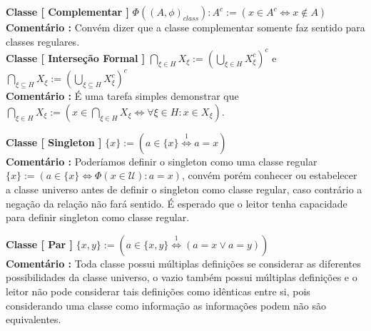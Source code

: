 \documentclass[10pt,a4paper]{report}
\begin{document}
\hspace{\baselineskip}

\textbf{Classe [ Complementar ]} $\Phi( (A,\phi)_{class} ) : A^c := ( x \in A^c \iff x \notin A ) $ \\

\textbf{Comentário :} Convém dizer que a classe complementar somente faz sentido para classes regulares.\\

\textbf{Classe [ Interseção Formal ]} $ \bigcap\limits_{\xi \in H} X_{\xi} := ( \bigcup\limits_{ \xi \in H } X_{\xi}^c  )^c  $ e $ \bigcap\limits_{\xi \subseteq H} X_{\xi} := ( \bigcup\limits_{ \xi \subseteq H } X_{\xi}^c  )^c $\\

\textbf{Comentário :} É uma tarefa simples demonstrar que $ \bigcap\limits_{\xi \in H} X_{\xi} := ( x \in \bigcap\limits_{\xi \in H} X_{\xi} \iff \forall \xi \in H : x \in X_{\xi} ) $.

\hspace{\baselineskip}

\textbf{Classe [ Singleton ]} $ \{x\} := ( a \in \{x\} \overset{1}{\iff} a = x ) $\\

\textbf{Comentário :} Poderíamos definir o singleton como uma classe regular $ \{x\} := ( a \in \{x\} \iff \Phi(x \in \mathcal{U}) : a = x ) $, convém porém conhecer ou estabelecer a classe universo antes de definir o singleton como classe regular, caso contrário a negação da relação não fará sentido. É esperado que o leitor tenha capacidade para definir singleton como classe regular.

\hspace{\baselineskip}

\textbf{Classe [ Par ]} $ \{x,y\} := ( a \in \{ x,y \} \overset{1}{\iff}  (a = x \vee a = y) ) $\\

\textbf{Comentário :} Toda classe possui múltiplas definições se considerar as diferentes possibilidades da classe universo, o vazio também possui múltiplas definições e o leitor não pode considerar tais definições como idênticas entre si, pois considerando uma classe como informação as informações podem não são equivalentes.\\
\end{document}

